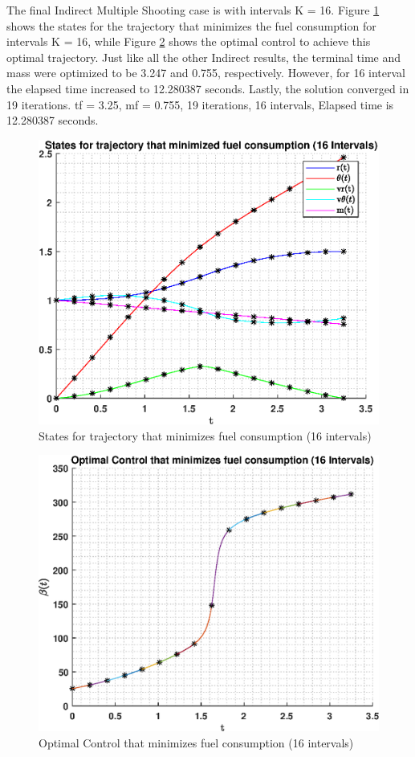 \documentclass[]{article}
\begin{document}
The final Indirect Multiple Shooting case is with intervals K = 16. Figure \ref{fig:indirectMultiStates16} shows the states for the trajectory that minimizes the fuel consumption for intervals K = 16, while Figure \ref{fig:indirectMultiControl16} shows the optimal control to achieve this optimal trajectory. Just like all the other Indirect results, the terminal time and mass were optimized to be 3.247 and 0.755, respectively. However, for 16 interval the elapsed time increased to 12.280387 seconds. Lastly, the solution converged in 19 iterations.
tf = 3.25, mf = 0.755, 19 iterations, 16 intervals, Elapsed time is 12.280387 seconds.
\begin{figure}
	\centering
	\includegraphics[scale=0.75]{indirectMultiStates16.eps}
	\caption{States for trajectory that minimizes fuel consumption (16 intervals)}
	\label{fig:indirectMultiStates16}
\end{figure}
\begin{figure}
	\centering
	\includegraphics[scale=0.75]{indirectMultiControl16.eps}
	\caption{Optimal Control that minimizes fuel consumption (16 intervals)}
	\label{fig:indirectMultiControl16}
\end{figure}
\end{document}
